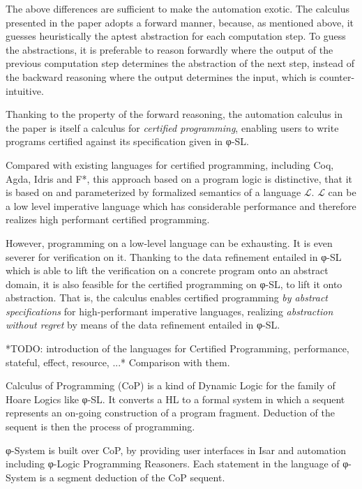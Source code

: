 The above differences are sufficient to make the automation exotic.
The calculus presented in the paper adopts a forward manner, because, as mentioned above, it guesses heuristically the aptest abstraction for each computation step. To guess the abstractions, it is preferable to reason forwardly where the output of the previous computation step determines the abstraction of the next step, instead of the backward reasoning where the output determines the input, which is counter-intuitive.

Thanking to the property of the forward reasoning,
the automation calculus in the paper is itself a calculus for \emph{certified programming}, enabling users to write programs certified against its specification given in φ-SL.

Compared with existing languages for certified programming, including Coq, Agda, Idris and F*, this approach based on a program logic is distinctive, that it is based on and parameterized by formalized semantics of a language $\mathcal{L}$. $\mathcal{L}$ can be a low level imperative language which has considerable performance and therefore realizes high performant certified programming.

However, programming on a low-level language can be exhausting. It is even severer for verification on it.
Thanking to the data refinement entailed in φ-SL which is able to lift the verification on a concrete program onto an abstract domain, it is also feasible for the certified programming on φ-SL, to lift it onto abstraction.
That is, the calculus enables certified programming \emph{by abstract specifications} for high-performant imperative languages, realizing \emph{abstraction without regret} by means of the data refinement entailed in φ-SL.




\newpage




*TODO: introduction of the languages for Certified Programming, performance, stateful, effect, resource, ...*
Comparison with them.

Calculus of Programming (CoP) is a kind of Dynamic Logic for the family of Hoare Logics like φ-SL.
It converts a HL to a formal system in which a sequent represents an on-going construction of
a program fragment. Deduction of the sequent is then the process of programming.

φ-System is built over CoP, by providing user interfaces in Isar and automation including φ-Logic
Programming Reasoners.
Each statement in the language of φ-System is a segment deduction of the CoP sequent.


